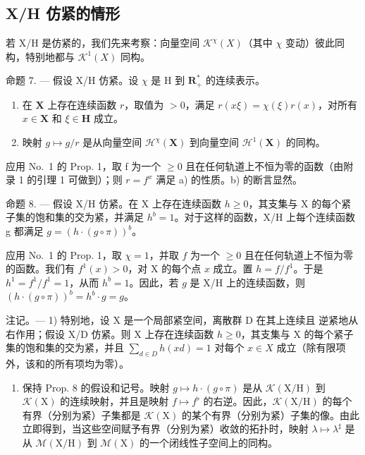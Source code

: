 \subsection{X/H 仿紧的情形}

若 X/H 是仿紧的，我们先来考察：向量空间 \(\mathcal{K}^{\chi}(X)\)（其中 \(\chi\) 变动）彼此同构，特别地都与 \(\mathcal{K}^{1}(X)\) 同构。

命题 7. --- 假设 X/H 仿紧。设 \(\chi\) 是 H 到 \(\mathbf{R}_{+}^{*}\) 的连续表示。

\begin{enumerate}
\def\labelenumi{\alph{enumi})}
\item
  在 \(\mathbf{X}\) 上存在连续函数 \(r\)，取值为 \(>0\)，满足 \(r(x\xi) = \chi (\xi)r(x)\)，对所有 \(x\in \mathbf{X}\) 和 \(\xi \in \mathbf{H}\) 成立。
\item
  映射 \(g \mapsto g / r\) 是从向量空间 \(\mathcal{H}^{\chi}(\mathbf{X})\) 到向量空间 \(\mathcal{H}^{1}(\mathbf{X})\) 的同构。
\end{enumerate}

应用 No.~1 的 Prop. 1，取 f 为一个 \(\geqslant0\) 且在任何轨道上不恒为零的函数（由附录 1 的引理 1 可做到）；则 \(r = f^{x}\) 满足 a) 的性质。b) 的断言显然。

命题 8. --- 假设 X/H 仿紧。在 X 上存在连续函数 \(h \geqslant 0\)，其支集与 X 的每个紧子集的饱和集的交为紧，并满足 \(h^{b}=1\)。对于这样的函数，X/H 上每个连续函数 g 都满足 \(g=\left(h\cdot(g\circ\pi)\right)^{b}\)。

应用 No.~1 的 Prop. 1，取 \(\chi = 1\)，并取 \(f\) 为一个 \(\geqslant 0\) 且在任何轨道上不恒为零的函数。我们有 \(f^1(x) > 0\)，对 X 的每个点 \(x\) 成立。置 \(h = f / f^1\)。于是 \(h^1 = f^1 / f^1 = 1\)，从而 \(h^b = 1\)。因此，若 \(g\) 是 X/H 上的连续函数，则 \(\left(h \cdot (g \circ \pi)\right)^b = h^b \cdot g = g\)。

注记。--- 1) 特别地，设 X 是一个局部紧空间，离散群 D 在其上连续且 逆紧地从右作用；假设 X/D 仿紧。则 X 上存在连续函数 \(h \geqslant 0\)，其支集与 X 的每个紧子集的饱和集的交为紧，并且 \(\sum_{d \in D} h(x d) = 1\) 对每个 \(x \in X\) 成立（除有限项外，该和的所有项均为零）。

\begin{enumerate}
\def\labelenumi{\arabic{enumi})}
\setcounter{enumi}{1}
\tightlist
\item
  保持 Prop. 8 的假设和记号。映射 \(g \mapsto h \cdot (g \circ \pi)\) 是从 \(\mathcal{K}(\mathrm{X / H})\) 到 \(\mathcal{K}(\mathrm{X})\) 的连续映射，并且是映射 \(f \mapsto f^{\flat}\) 的右逆。因此，\(\mathcal{K}(\mathrm{X / H})\) 的每个有界（分别为紧）子集都是 \(\mathcal{K}(\mathrm{X})\) 的某个有界（分别为紧）子集的像。由此立即得到，当这些空间赋予有界（分别为紧）收敛的拓扑时，映射 \(\lambda \mapsto \lambda^{\sharp}\) 是从 \(\mathcal{M}(\mathrm{X / H})\) 到 \(\mathcal{M}(\mathrm{X})\) 的一个闭线性子空间上的同构。
\end{enumerate}

